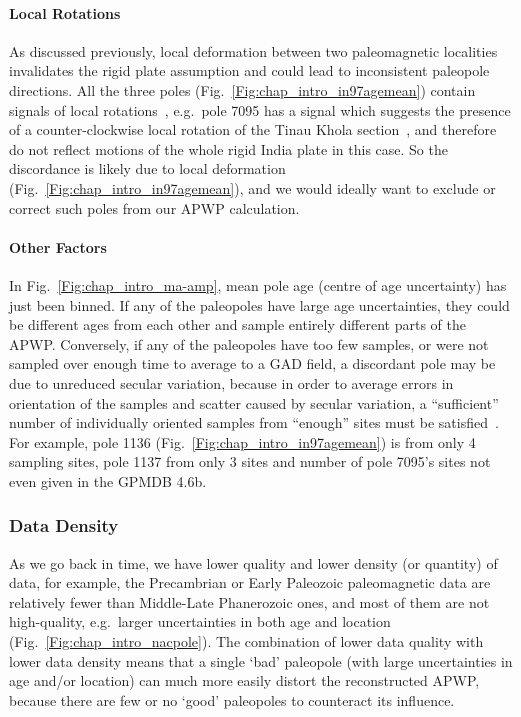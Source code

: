 \paragraph{Local Rotations}

As discussed previously, local deformation between two paleomagnetic localities
invalidates the rigid plate assumption and could lead to inconsistent paleopole
directions. All the three poles (Fig.~\ref{Fig:chap_intro_in97agemean})
contain signals of local rotations~\citep{O82,G94}, e.g.\ pole 7095 has a signal
which suggests the presence of a counter-clockwise local rotation of the Tinau
Khola section~\citep{G94}, and therefore do not reflect motions of the whole
rigid India plate in this case. So the discordance is likely due to local
deformation (Fig.~\ref{Fig:chap_intro_in97agemean}), and we would ideally
want to exclude or correct such poles from our APWP calculation.

\paragraph{Other Factors}

In Fig.~\ref{Fig:chap_intro_ma-amp}, mean pole age (centre of age uncertainty)
has just been binned. If any of the paleopoles have large age uncertainties,
they could be different ages from each other and sample entirely different parts
of the APWP\@. Conversely, if any of the paleopoles have too few samples, or
were not sampled over enough time to average to a GAD field, a discordant pole
may be due to unreduced secular variation, because in order to average errors in
orientation of the samples and scatter caused by secular variation, a
``sufficient'' number of individually oriented samples from ``enough'' sites
must be satisfied~\citep{T19,v90,B02}. For example, pole 1136
(Fig.~\ref{Fig:chap_intro_in97agemean}) is from only 4 sampling sites, pole 1137
from only 3 sites and number of pole 7095's sites not even given in the GPMDB
4.6b.

\subsubsection{Data Density}\label{sec:datden}

As we go back in time, we have lower quality and lower density (or quantity) of
data, for example, the Precambrian or Early Paleozoic paleomagnetic data are
relatively fewer than Middle-Late Phanerozoic ones, and most of them are not
high-quality, e.g.\ larger uncertainties in both age and location
(Fig.~\ref{Fig:chap_intro_nacpole}). The combination of lower data quality with
lower data density means that a single `bad' paleopole (with large uncertainties
in age and/or location) can much more easily distort the reconstructed APWP,
because there are few or no `good' paleopoles to counteract its influence.

